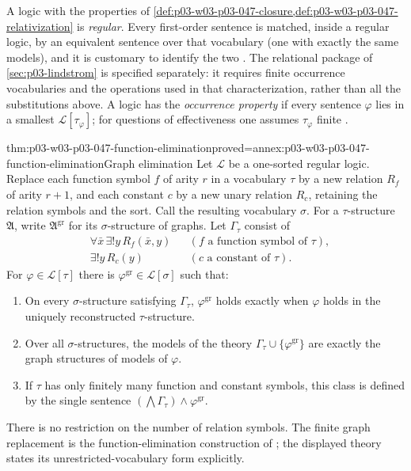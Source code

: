 A logic with the properties of
\cref{def:p03-w03-p03-047-closure,def:p03-w03-p03-047-relativization} is
\emph{regular}.  Every first-order sentence is matched, inside a regular logic, by
an equivalent sentence over that vocabulary (one with exactly the same models), and it is customary to
identify the two \cite[Ch.~II, \S1.2, p.~31]{Ebbinghaus1985ExtendedLogics}.
The relational package of \cref{sec:p03-lindstrom} is specified
separately: it requires finite occurrence vocabularies and the operations
used in that characterization, rather than all the substitutions above.  A logic has
the \emph{occurrence property} if every sentence \(\varphi\) lies in a
smallest \(\mathscr L[\tau_\varphi]\); for questions of effectiveness one
assumes \(\tau_\varphi\) finite \cite[Ch.~II, \S1.2, p.~31]{Ebbinghaus1985ExtendedLogics}.

\begin{hbtheorem}{thm:p03-w03-p03-047-function-elimination}{proved=annex:p03-w03-p03-047-function-elimination}{Graph elimination}
Let \(\mathscr L\) be a one-sorted regular logic. Replace each function
symbol \(f\) of arity \(r\) in a vocabulary \(\tau\) by a new
relation \(R_f\) of arity \(r+1\), and each constant \(c\) by a new unary relation \(R_c\),
retaining the relation symbols and the sort. Call the resulting
vocabulary \(\sigma\). For a \(\tau\)-structure \(\mathfrak A\),
write \(\mathfrak A^{\mathrm{gr}}\) for its \(\sigma\)-structure of graphs.
Let \(\Gamma_\tau\) consist of
\[
 \begin{aligned}
 &\forall\bar x\,\exists!y\,R_f(\bar x,y)
      &&(f\text{ a function symbol of }\tau),\\
 &\exists!y\,R_c(y)
      &&(c\text{ a constant of }\tau).
 \end{aligned}
\]
For \(\varphi\in\mathscr L[\tau]\) there is
\(\varphi^{\mathrm{gr}}\in\mathscr L[\sigma]\) such that:
\begin{enumerate}
 \item On every \(\sigma\)-structure satisfying \(\Gamma_\tau\),
       \(\varphi^{\mathrm{gr}}\) holds exactly when \(\varphi\)
       holds in the uniquely reconstructed \(\tau\)-structure.
 \item Over all \(\sigma\)-structures, the models of the theory
       \(\Gamma_\tau\cup\{\varphi^{\mathrm{gr}}\}\) are exactly
       the graph structures of models of \(\varphi\).
 \item If \(\tau\) has only finitely many function and constant symbols,
       this class is defined by the single sentence
       \((\bigwedge\Gamma_\tau)\land\varphi^{\mathrm{gr}}\).
\end{enumerate}
There is no restriction on the number of relation symbols.
The finite graph replacement is the function-elimination construction of
\cite[Ch.~II, \S1.2, p.~31]{Ebbinghaus1985ExtendedLogics}; the displayed
theory states its unrestricted-vocabulary form explicitly.
\end{hbtheorem}

